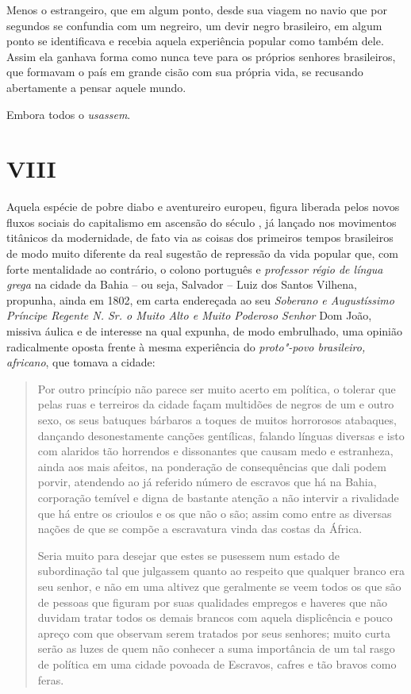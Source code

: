 Menos o estrangeiro, que em algum ponto, desde sua viagem no navio que
por segundos se confundia com um negreiro, um devir negro brasileiro, em
algum ponto se identificava e recebia aquela experiência popular como
também dele. Assim ela ganhava forma como nunca teve para os próprios
senhores brasileiros, que formavam o país em grande cisão com sua
própria vida, se recusando abertamente a pensar aquele mundo.

Embora todos o \emph{usassem}.

\section{VIII}

Aquela espécie de pobre diabo e aventureiro europeu, figura liberada
pelos novos fluxos sociais do capitalismo em ascensão do século , já
lançado nos movimentos titânicos da modernidade, de fato via as coisas
dos primeiros tempos brasileiros de modo muito diferente da real
sugestão de repressão da vida popular que, com forte mentalidade ao
contrário, o colono português e \emph{professor régio de língua grega}
na cidade da Bahia -- ou seja, Salvador -- Luiz dos Santos Vilhena,
propunha, ainda em 1802, em carta endereçada ao seu \emph{Soberano e
Augustíssimo Príncipe Regente N. Sr. o Muito Alto e Muito Poderoso
Senhor} Dom João, missiva áulica e de interesse na qual expunha, de modo
embrulhado, uma opinião radicalmente oposta frente à mesma experiência
do \emph{proto"-povo brasileiro, africano}, que tomava a cidade:

\begin{quote}
Por outro princípio não parece ser muito acerto em política, o tolerar
que pelas ruas e terreiros da cidade façam multidões de negros de um e
outro sexo, os seus batuques bárbaros a toques de muitos horrorosos
atabaques, dançando desonestamente canções gentílicas, falando línguas
diversas e isto com alaridos tão horrendos e dissonantes que causam medo
e estranheza, ainda aos mais afeitos, na ponderação de consequências que
dali podem porvir, atendendo ao já referido número de escravos que há na
Bahia, corporação temível e digna de bastante atenção a não intervir a
rivalidade que há entre os crioulos e os que não o são; assim como entre
as diversas nações de que se compõe a escravatura vinda das costas da
África.

Seria muito para desejar que estes se pusessem num estado de
subordinação tal que julgassem quanto ao respeito que qualquer branco
era seu senhor, e não em uma altivez que geralmente se veem todos os que
são de pessoas que figuram por suas qualidades empregos e haveres que
não duvidam tratar todos os demais brancos com aquela displicência e
pouco apreço com que observam serem tratados por seus senhores; muito
curta serão as luzes de quem não conhecer a suma importância de um tal
rasgo de política em uma cidade povoada de Escravos, cafres e tão bravos
como feras.
\end{quote}


